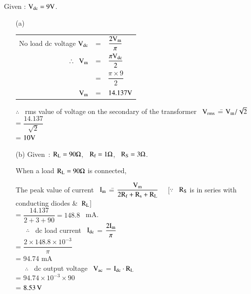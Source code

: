 \begin{solution}
Given : $\textrm{V}_{\text{dc}}=9\textrm{V}$.
\begin{itemize}
\item[(a)] \begin{tabular}[t]{r@{\;\,}c@{\;\,}l}
No load dc voltage $\textrm{V}_{\text{dc}}$ & = & $\dfrac{2\textrm{V}_{\textrm{m}}}{\pi}$\\[10pt]
$\therefore \ \ \rmV_{\rmm}$ & = & $\dfrac{\pi\textrm{V}_{\text{dc}}}{2}$\\[8pt]
 & = & $\dfrac{\pi\times 9}{2}$\\[8pt]
$\textrm{V}_{\textrm{m}}$ & = & $14.137\textrm{V}$
\end{tabular}

\eject

\begin{tabbing}
$\therefore$~ rms value of voltage on the secondary of the transformer \ $\textrm{V}_{\text{rms}}$ \== $\textrm{V}_{\textrm{m}}/\sqrt{2}$\\[5pt]
                  \>= $\dfrac{14.137}{\sqrt{2}}$\\[5pt]
                  \>= $10\textrm{V}$
\end{tabbing}

\item[(b)] Given~: $\textrm{R}_{\textrm{L}}=90\Omega$, \ $\textrm{R}_{\textrm{f}}=1\Omega$, \ $\textrm{R}_{\textrm{S}}=3\Omega$.

When a load $\textrm{R}_{\textrm{L}}=90\Omega$ is connected,

\begin{tabbing}
The peak value of current \ $\textrm{I}_{\textrm{m}}$ \== $\dfrac{\textrm{V}_{\textrm{m}}}{2\textrm{R}_{\textrm{f}}+\textrm{R}_{\textrm{s}}+\textrm{R}_{\textrm{L}}}$ \ \ [$\because$ \ $\textrm{R}_{\textrm{S}}$ is in series with\\[1pt]
\>\hspace{3cm} conducting diodes \&\ $\textrm{R}_{\textrm{L}}$]\\[5pt]
\>= $\dfrac{14.137}{2+3+90}=148.8$ \ mA.\\[4pt]
\qquad~~\, $\therefore$ \ dc load current \ $\textrm{I}_{\text{dc}}$ \>= $\dfrac{2\textrm{I}_{\textrm{m}}}{\pi}$\\[4pt]
\>= $\dfrac{2\times 148.8\times 10^{-3}}{\pi}$\\[4pt]
\>= 94.74 mA\\[4pt]
\quad~~ $\therefore$ \ dc output voltage \ $\textrm{V}_{\text{ac}}$ \>= $\textrm{I}_{\text{dc}}\cdot \textrm{R}_{\textrm{L}}$\\[4pt]
\>= $94.74\times 10^{-3}\times 90$\\[4pt]
\>= $8.53\,\textrm{V}$ 
\end{tabbing}
\end{itemize}
\end{solution}

